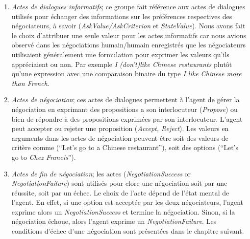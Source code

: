 \begin{enumerate}
	
	\item \textit{Actes de dialogues informatifs}; ce groupe fait référence aux actes de dialogues utilisés pour échanger des informations sur les préférences respectives des négociateurs, à savoir (\textit{AskValue/AskCriterion} et \textit{StateValue}). 
	Nous avons fait le choix d'attribuer une seule valeur pour les actes informatifs car nous avions observé dans les négociations humain/humain enregistrés que les négociateurs utilisaient généralement une formulation pour exprimer les valeurs qu'ils appréciaient ou non. Par exemple \textit{I (don't)like Chinese restaurants} plutôt qu'une expression avec une comparaison binaire du type \textit{I like Chinese more than French}.
	
	\item \textit{Actes de négociation}; ces actes de dialogues permettent à l'agent de gérer la négociation en exprimant des propositions a son interlocuteur (\textit{Propose}) ou bien de répondre à des propositions exprimées par son interlocuteur. L'agent peut accepter ou rejeter une proposition (\textit{Accept, Reject}). Les valeurs en arguments dans les actes de négociation peuvent être soit des valeurs de critère comme (``Let's go to a Chinese restaurant''), soit des options  (``Let's go to \emph{Chez Francis}''). 
	
	\item \textit{Actes de fin de négociation}; les actes  (\textit{NegotiationSuccess} or \textit{NegotiationFailure}) sont utilisés pour clore une négociation soit par une réussite, soit par un échec. Le choix de l'acte dépend de l'état mental de l'agent. En effet, si une option est acceptée par les deux négociateurs, l'agent exprime alors un \textit{NegotiationSuccess} et termine la négociation. Sinon, si la négociation échoue, alors l'agent exprime un \textit{NegotiationFailure}. Les conditions d'échec d'une négociation sont présentées dans le chapitre suivant. 
	
\end{enumerate}

